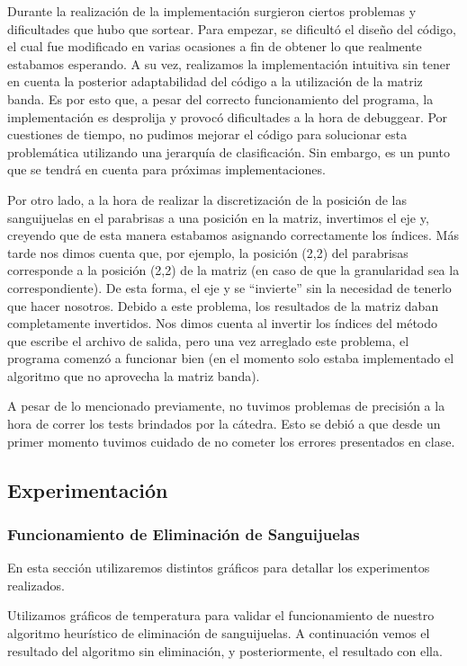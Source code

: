 \par 
Durante la realización de la implementación surgieron ciertos problemas y dificultades que hubo que sortear. Para empezar, se dificultó el diseño del código, el cual fue modificado en varias ocasiones a fin de obtener lo que realmente estabamos esperando. A su vez, realizamos la implementación intuitiva sin tener en cuenta la posterior adaptabilidad del código a la utilización de la matriz banda. Es por esto que, a pesar del correcto funcionamiento del programa, la implementación es desprolija y provocó dificultades a la hora de debuggear. Por cuestiones de tiempo, no pudimos mejorar el código para solucionar esta problemática utilizando una jerarquía de clasificación. Sin embargo, es un punto que se tendrá en cuenta para próximas implementaciones.
\par 
Por otro lado, a la hora de realizar la discretización de la posición de las sanguijuelas en el parabrisas a una posición en la matriz, invertimos el eje y, creyendo que de esta manera estabamos asignando correctamente los índices. Más tarde nos dimos cuenta que, por ejemplo, la posición (2,2) del parabrisas corresponde a la posición (2,2) de la matriz (en caso de que la granularidad sea la correspondiente). De esta forma, el eje y se ``invierte'' sin la necesidad de tenerlo que hacer nosotros. Debido a este problema, los resultados de la matriz daban completamente invertidos. Nos dimos cuenta al invertir los índices del método que escribe el archivo de salida, pero una vez arreglado este problema, el programa comenzó a funcionar bien (en el momento solo estaba implementado el algoritmo que no aprovecha la matriz banda).
\par 
A pesar de lo mencionado previamente, no tuvimos problemas de precisión a la hora de correr los tests brindados por la cátedra. Esto se debió a que desde un primer momento tuvimos cuidado de no cometer los errores presentados en clase. 


\subsection{Experimentación}
\subsubsection{Funcionamiento de Eliminación de Sanguijuelas}
	En esta sección utilizaremos distintos gráficos para detallar los experimentos realizados. 

	Utilizamos gráficos de temperatura para validar el funcionamiento de nuestro algoritmo heurístico de eliminación de sanguijuelas. A continuación vemos el resultado del algoritmo sin eliminación, y posteriormente, el resultado con ella.

